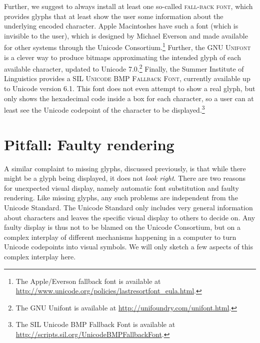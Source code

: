 Further, we suggest to always install at least one so-called \textsc{fall-back font}, which provides glyphs that at least show the user some information about the underlying encoded character. Apple Macintoshes have such a font (which is invisible to the user), which is designed by Michael Everson and made available for other systems through the Unicode Consortium.\footnote{The Apple/Everson fallback font is available at \url{http://www.unicode.org/policies/lastresortfont\_eula.html}.} Further, the \textsc{GNU Unifont} is a clever way to produce bitmaps approximating the intended glyph of each available character, updated to Unicode 7.0.\footnote{The GNU Unifont is available at \url{http://unifoundry.com/unifont.html}.} Finally, the Summer Institute of Linguistics provides a \textsc{SIL Unicode BMP Fallback Font}, currently available up to Unicode version 6.1. This font does not even attempt to show a real glyph, but only shows the hexadecimal code inside a box for each character, so a user can at least see the Unicode codepoint of the character to be displayed.\footnote{The SIL Unicode BMP Fallback Font is available at \url{http://scripts.sil.org/UnicodeBMPFallbackFont}.}

\section{Pitfall: Faulty rendering}
\label{pitfall-faulty-rendering}

A similar complaint to missing glyphs, discussed previously, is that while there might be a glyph being displayed, it does not \textit{look right}. There are two reasons for unexpected visual display, namely automatic font substitution and faulty rendering. Like missing glyphs, any such problems are independent from the Unicode Standard. The Unicode Standard only includes very general information about characters and leaves the specific visual display to others to decide on. Any faulty display is thus not to be blamed on the Unicode Consortium, but on a complex interplay of different mechanisms happening in a computer to turn Unicode codepoints into visual symbols. We will only sketch a few aspects of this complex interplay here.

